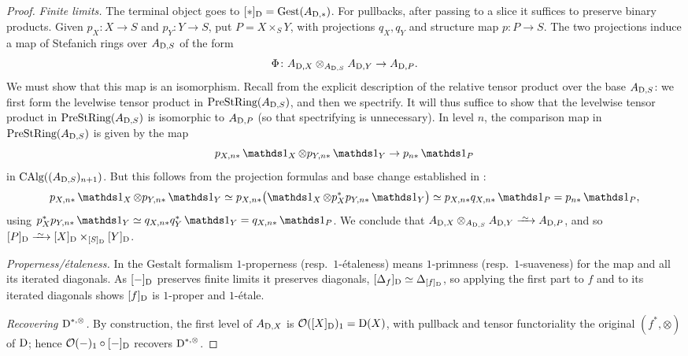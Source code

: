 \documentclass[11pt]{book}
\begin{document}
\begin{proof}
		\emph{Finite limits.} The terminal object goes to $[*]_{\operatorname{\mathrm{D}}} = {\textup{Gest}}(A_{\operatorname{\mathrm{D}},*})$. For pullbacks, after passing to a slice it suffices to preserve binary products. Given $p_X\colon X\to S$ and $p_Y\colon Y\to S$, put $P = X\times_S Y$, with projections $q_X,q_Y$ and structure map $p\colon P\to S$. The two projections induce a map of Stefanich rings over $A_{\operatorname{\mathrm{D}},S}$ of the form
		\[
			\Phi\colon A_{\operatorname{\mathrm{D}},X}\otimes_{A_{\operatorname{\mathrm{D}},S}}A_{\operatorname{\mathrm{D}},Y} \to A_{\operatorname{\mathrm{D}},P}.
		\]
		We must show that this map is an isomorphism. Recall from  the explicit description of the relative tensor product over the base $A_{\operatorname{\mathrm{D}},S}$: we first form the levelwise tensor product in ${\textup{PreStRing}}(A_{\operatorname{\mathrm{D}},S})$, and then we spectrify. It will thus suffice to show that the levelwise tensor product in ${\textup{PreStRing}}(A_{\operatorname{\mathrm{D}},S})$ is isomorphic to $A_{\operatorname{\mathrm{D}},P}$ (so that spectrifying is unnecessary). In level $n$, the comparison map in ${\textup{PreStRing}}(A_{\operatorname{\mathrm{D}},S})$ is given by the map
		\[
			p_{X,n*}\unit_X\otimes p_{Y,n*}\unit_Y\to p_{n*}\unit_P
		\]
		in ${\textup{CAlg}}((A_{\operatorname{\mathrm{D}},S})_{n+1})$. But this follows from the projection formulas and base change established in :
		\[
			p_{X,n*}\unit_X\otimes p_{Y,n*}\unit_Y \simeq p_{X,n*}\bigl(\unit_X\otimes p_X^*p_{Y,n*}\unit_Y\bigr) \simeq p_{X,n*}q_{X,n*}\unit_P = p_{n*}\unit_P,
		\]
		using $p_X^*p_{Y,n*}\unit_Y\simeq q_{X,n*}q_Y^*\unit_Y = q_{X,n*}\unit_P$. We conclude that $A_{\D,X}\otimes_{A_{\D,S}}A_{\D,Y}\iso A_{\D,P}$, and so $[P]_{\D}\iso[X]_{\D}\times_{[S]_{\D}}[Y]_{\D}$.

		\emph{Properness/étaleness.} In the Gestalt formalism $1$-properness (resp.\ $1$-étaleness) means $1$-primness (resp.\ $1$-suaveness) for the map and all its iterated diagonals. As $[-]_{\operatorname{\mathrm{D}}}$ preserves finite limits it preserves diagonals, $[\Delta_f]_{\operatorname{\mathrm{D}}}\simeq\Delta_{[f]_{\operatorname{\mathrm{D}}}}$, so applying the first part to $f$ and to its iterated diagonals shows $[f]_{\operatorname{\mathrm{D}}}$ is $1$-proper and $1$-étale.

		\emph{Recovering $\operatorname{\mathrm{D}}^{*,\otimes}$.} By construction, the first level of $A_{\operatorname{\mathrm{D}},X}$ is $\mathcal{O}([X]_{\operatorname{\mathrm{D}}})_1 = \operatorname{\mathrm{D}}(X)$, with pullback and tensor functoriality the original $(f^*,\otimes)$ of $\operatorname{\mathrm{D}}$; hence $\mathcal{O}(-)_1\circ[-]_{\operatorname{\mathrm{D}}}$ recovers $\operatorname{\mathrm{D}}^{*,\otimes}$.
	\end{proof}

\end{document}
